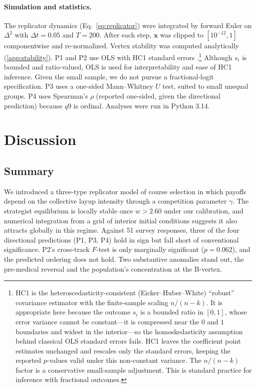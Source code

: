 \documentclass[12pt]{article}
\begin{document}
\paragraph{Simulation and statistics.}
\label{sec:sim}
The replicator dynamics (Eq.~\ref{eq:replicator}) were integrated by
forward Euler on $\Delta^2$ with $\Delta t = 0.05$ and $T = 200$. After
each step, $\bm{x}$ was clipped to $[10^{-12}, 1]$ componentwise and
re-normalized. Vertex stability was computed analytically
(\ref{app:stability}). P1 and P2 use OLS with HC1
standard errors \parencite{long2000using}.\footnote{HC1 is the
heteroscedasticity-consistent (Eicker--Huber--White) ``robust''
covariance estimator with the finite-sample scaling $n/(n-k)$. It is
appropriate here because the outcome $s_i$ is a bounded ratio in
$[0,1]$, whose error variance cannot be constant---it is compressed
near the $0$ and $1$ boundaries and widest in the interior---so the
homoskedasticity assumption behind classical OLS standard errors
fails. HC1 leaves the coefficient point estimates unchanged and
rescales only the standard errors, keeping the reported $p$-values
valid under this non-constant variance. The $n/(n-k)$ factor is a
conservative small-sample adjustment. This is standard practice for
inference with fractional outcomes.} Although $s_i$ is bounded
and ratio-valued, OLS is used for interpretability and ease of HC1
inference. Given the small sample, we do not pursue a fractional-logit
specification. P3 uses a one-sided Mann--Whitney $U$ test, suited to
small unequal groups. P4 uses
Spearman's $\rho$ (reported one-sided, given the directional
prediction) because $q9$ is ordinal. Analyses were run in
Python 3.14.

\section{Discussion}
\label{sec:discussion}

\subsection{Summary}

We introduced a three-type replicator model of course selection in
which payoffs depend on the collective layup intensity through a
competition parameter $\gamma$. The strategist equilibrium is locally
stable once $w > 2.60$ under our calibration, and numerical
integration from a grid of interior initial conditions suggests it
also attracts globally in this regime.
Against 51 survey responses, three of the four directional predictions
(P1, P3, P4) hold in sign but fall short of conventional significance.
P2's cross-track $F$-test is only marginally significant ($p = 0.062$),
and the predicted ordering does not hold. Two substantive anomalies
stand out, the pre-medical reversal and the population's concentration
at the B-vertex.
\end{document}
